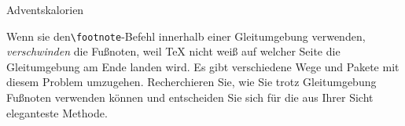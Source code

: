 \documentclass[
	vorläufig=true, 
	blattnr=4,
	ausgabe=2017-11-17,
	abgabe=2017-11-24,
	lösung=false,
	shortverb,
]{../tex/latexkurs-exercise}
\begin{document}
\begin{aufgabe}[12]{Adventskalorien}
\begin{enumerate}[resume, label=\alph*)]
		Wenn sie den\texttt{\textbackslash footnote}-Befehl innerhalb einer Gleitumgebung verwenden, \emph{verschwinden} die Fußnoten, weil \TeX{} nicht weiß auf welcher Seite die Gleitumgebung am Ende landen wird. Es gibt verschiedene Wege und Pakete mit diesem Problem umzugehen. Recherchieren Sie, wie Sie trotz Gleitumgebung Fußnoten verwenden können und entscheiden Sie sich für die aus Ihrer Sicht eleganteste Methode.
	\end{enumerate}
\end{aufgabe}

\clearpage
{}
\end{document}

